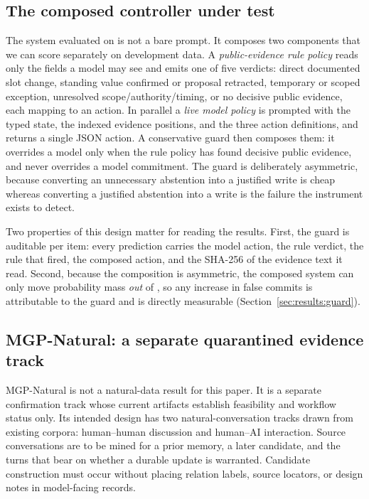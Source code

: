 \subsection{The composed controller under test}
\label{sec:v43controller}

The system evaluated on \mgpc{} is not a bare prompt. It composes two
components that we can score separately on development data. A
\emph{public-evidence rule policy} reads only the fields a model may see and
emits one of five verdicts: direct documented slot change, standing value
confirmed or proposal retracted, temporary or scoped exception, unresolved
scope/authority/timing, or no decisive public evidence, each mapping to an
action. In parallel a \emph{live model policy} is prompted with the typed state,
the indexed evidence positions, and the three action definitions, and returns a
single JSON action. A conservative guard then composes them: it overrides a
model \abstain{} only when the rule policy has found decisive public evidence,
and never overrides a model commitment. The guard is deliberately asymmetric,
because converting an unnecessary abstention into a justified write is cheap
whereas converting a justified abstention into a write is the failure the
instrument exists to detect.

Two properties of this design matter for reading the results. First, the guard
is auditable per item: every prediction carries the model action, the rule
verdict, the rule that fired, the composed action, and the SHA-256 of the
evidence text it read. Second, because the composition is asymmetric, the
composed system can only move probability mass \emph{out} of \abstain{}, so any
increase in false commits is attributable to the guard and is directly
measurable (Section~\ref{sec:results:guard}).

\subsection{MGP-Natural: a separate quarantined evidence track}
\label{sec:mgp-natural}

MGP-Natural is not a natural-data result for this paper. It is a separate
confirmation track whose current artifacts establish feasibility and workflow
status only. Its intended design has two natural-conversation tracks drawn from
existing corpora: human--human discussion and human--AI interaction. Source
conversations are to be mined for a prior memory, a later candidate, and the
turns that bear on whether a durable update is warranted. Candidate construction
must occur without placing relation labels, source locators, or design notes in
model-facing records.

